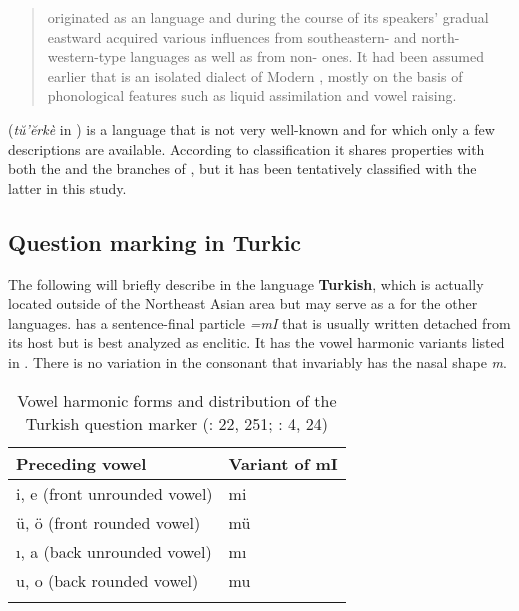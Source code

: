 \begin{quote}
 originated as an  language and during the course of its speakers’ gradual eastward  acquired various influences from southeastern- and north- western-type  languages as well as from non- ones. It had been assumed earlier that  is an isolated dialect of Modern , mostly on the basis of phonological features such as liquid assimilation and vowel raising. \citep[400]{Hahn1998}
\end{quote}

 (\textit{tŭ’ĕrkè}  in ) is a language that is not very well-known and for which only a few descriptions are available. According to  classification it shares properties with both the  and the  branches of , but it has been tentatively classified with the latter in this study.

\subsection{Question marking in Turkic}\label{sec:5.11.2}

The following will briefly describe  in the \textbf{} language \textbf{Turkish}, which is actually located outside of the Northeast Asian area but may serve as a  for the other  languages.  has a sentence-final particle \textit{=mI} that is usually written detached from its host but is best analyzed as enclitic. It has the vowel harmonic variants listed in . There is no variation in the consonant that invariably has the nasal shape \textit{m}.

\begin{table}
\caption{Vowel harmonic forms and distribution of the Turkish question marker (\citealt{GökselKerslake2005}: 22, 251; \citealt{Landmann2009}: 4, 24)}
\label{tab:turk:1}

\begin{tabularx}{\textwidth}{XX}
\lsptoprule

\textbf{Preceding vowel} & \textbf{Variant of mI}\\
\midrule
i, e (front unrounded vowel) & mi\\
ü, ö (front rounded vowel) & mü\\
ı, a (back unrounded vowel) & mı\\
u, o (back rounded vowel) & mu\\
\lspbottomrule
\end{tabularx}
\end{table}

